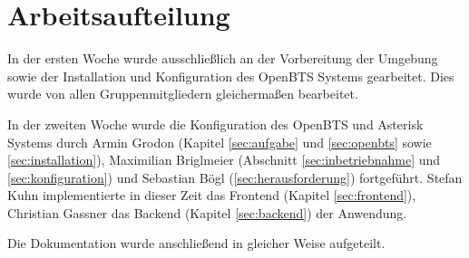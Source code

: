 \section{Arbeitsaufteilung}
In der ersten Woche wurde ausschließlich an der Vorbereitung der Umgebung sowie der Installation und Konfiguration des OpenBTS Systems gearbeitet. Dies wurde von allen Gruppenmitgliedern gleichermaßen bearbeitet.

In der zweiten Woche wurde die Konfiguration des OpenBTS und Asterisk Systems durch Armin Grodon (Kapitel \ref{sec:aufgabe} und \ref{sec:openbts} sowie \autoref{sec:installation}), 
Maximilian Briglmeier (Abschnitt \ref{sec:inbetriebnahme} und \ref{sec:konfiguration})
und Sebastian Bögl (\autoref{sec:herausforderung}) fortgeführt. 
Stefan Kuhn implementierte in dieser Zeit das Frontend (Kapitel \ref{sec:frontend}), 
Christian Gassner das Backend (Kapitel \ref{sec:backend}) der Anwendung.

Die Dokumentation wurde anschließend in gleicher Weise aufgeteilt.